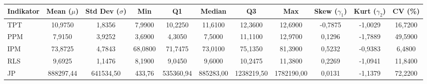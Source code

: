 \begin{adjustbox}{max width=\textwidth}
\small
\begin{tabular}{|>{\centering\arraybackslash}p{2.5cm}|c|c|c|c|c|c|c|c|c|c|}
\hline
\textbf{Indikator} & \textbf{Mean ($\mu$)} & \textbf{Std Dev ($\sigma$)} & \textbf{Min} & \textbf{Q1} & \textbf{Median} & \textbf{Q3} & \textbf{Max} & \textbf{Skew ($\gamma_1$)} & \textbf{Kurt ($\gamma_2$)} & \textbf{CV (\%)} \\
\hline
TPT & 10,9750 & 1,8356 & 7,9900 & 10,2250 & 11,6100 & 12,3600 & 12,6900 & -0,7875 & -1,0029 & 16,7200 \\
PPM & 7,9150 & 3,9252 & 3,6900 & 4,3050 & 7,5000 & 11,1100 & 12,9700 & 0,1296 & -1,7889 & 49,5900 \\
IPM & 73,8725 & 4,7843 & 68,0800 & 71,7475 & 73,0100 & 75,1350 & 81,3900 & 0,5232 & -0,9383 & 6,4800 \\
RLS & 9,6925 & 1,1476 & 8,1900 & 9,0450 & 9,6000 & 10,2475 & 11,3800 & 0,2269 & -1,0941 & 11,8400 \\
JP & 888297,44 & 641534,50 & 433,76 & 535360,94 & 885283,00 & 1238219,50 & 1782190,00 & 0,0131 & -1,1379 & 72,2200 \\
\hline
\end{tabular}
\end{adjustbox}

